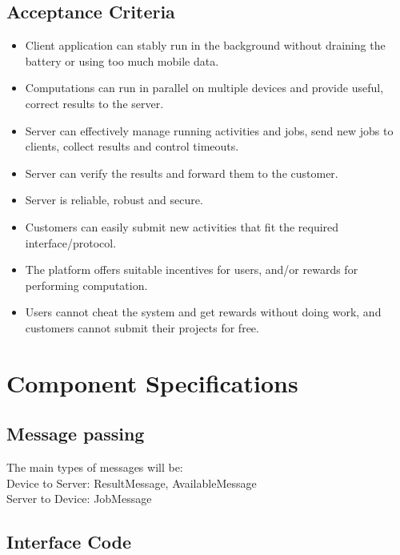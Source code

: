 \documentclass[a4paper,10pt]{article}
\begin{document}
\subsection{Acceptance Criteria}

\begin{itemize}
	\item Client application can stably run in the background without draining the battery or using too much mobile data.
	\item Computations can run in parallel on multiple devices and provide useful, correct results to the server.
	\item Server can effectively manage running activities and jobs, send new jobs to clients, collect results and control timeouts.
	\item Server can verify the results and forward them to the customer.
	\item Server is reliable, robust and secure.
	\item Customers can easily submit new activities that fit the required interface/protocol.
	\item The platform offers suitable incentives for users, and/or rewards for performing computation.
	\item Users cannot cheat the system and get rewards without doing work, and customers cannot submit their projects for free.
\end{itemize}

\section{Component Specifications}


\subsection{Message passing}

The main types of messages will be: \\
Device to Server: ResultMessage, AvailableMessage \\ 
Server to Device: JobMessage


\subsection{Interface Code}




\end{document}
